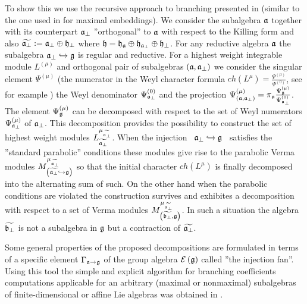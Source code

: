 \documentclass[12pt]{article}
\theoremstyle{definition}
\begin{document}
To show this we use the recursive approach to branching presented in \cite{2010arXiv1007.0318L} (similar to the one used in \cite{ilyin812pbc} for maximal
embeddings). We consider the subalgebra $\frak{a}$ together with its
counterpart $\frak{a}_{\bot }$ ''orthogonal'' to $\frak{a}$ with respect to
the Killing form and also $\widetilde{\frak{a}_{\perp }}:=\frak{a}_{\perp
}\oplus \frak{h}_{\perp }$ where $\frak{h}=\frak{\frak{h}_{\frak{a}}}\oplus 
\frak{h}_{\frak{a}_{\perp }}\oplus \frak{h}_{\perp }$. For any reductive
algebra $\frak{a}$ the subalgebra $\frak{a}_{\bot }\hookrightarrow \frak{g}$
is regular and reductive. For a highest weight integrable module $L^{\left(
\mu \right) }$ and orthogonal pair of subalgebras $\left( \frak{a},\frak{a}%
_{\bot }\right) $ we consider the singular element $\Psi ^{\left( \mu
\right) }$ (the numerator in the Weyl character formula $ch\left( L^{\mu
}\right) =\frac{\Psi ^{\left( \mu \right) }}{\Psi ^{\left( 0\right) }}$, see
for example \cite{humphreys1997introduction}) the Weyl denominator $\Psi _{%
\frak{a}_{\bot }}^{\left( 0\right) }$ and the projection $\Psi _{\left(
\frak{a},\frak{a}_{\bot }\right) }^{\left( \mu \right) }=\pi _{\frak{a}}%
\frac{\Psi _{\frak{g}}^{\left( \mu \right) }}{\Psi _{\frak{a}_{\bot
}}^{\left( 0\right) }}$. The element $\Psi _{\frak{g}}^{\left( \mu \right) }$
can be decomposed with respect to the set of Weyl numerators $\Psi _{\frak{a}%
_{\bot }}^{\left( \mu \right) }$ of $\frak{a}_{\bot }$. This decomposition
provides the possibility to construct the set of highest weight modules $L_{%
\widetilde{\frak{a}_{\perp }}}^{\mu _{\widetilde{\frak{a}_{\perp }}}}$. When
the injection \ $\frak{a}_{\bot }\hookrightarrow \frak{g}$ \ satisfies the
''standard parabolic'' conditions these modules give rise to the parabolic
Verma modules $M_{\left( \widetilde{\frak{a}_{\perp }}\hookrightarrow \frak{g%
}\right) }^{\mu _{\widetilde{\frak{a}_{\perp }}}}$ so that the initial
character $ch\left( L^{\mu }\right) $ is finally decomposed into the
alternating sum of such. On the other hand when the parabolic conditions are
violated the construction survives and exhibites a decomposition with
respect to a set of Verma modules $M_{\left( \widetilde{\frak{b}_{\perp }},%
\frak{g}\right) }^{\mu _{\widetilde{\frak{a}_{\perp }}}}$. In such a
situation the algebra $\widetilde{\frak{b}_{\perp }}$ is not a subalgebra in 
$\frak{g}$ but a contraction of $\widetilde{\frak{a}_{\perp }}$.

Some general properties of the proposed decompositions are formulated in
terms of a specific element $\Gamma _{\frak{a}\rightarrow \frak{g}}$ of the
group algebra $\mathcal{E}\left( \frak{g}\right) $ called ''the injection
fan''. Using this tool the simple and explicit algorithm for branching
coefficients computations applicable for an arbitrary (maximal or
nonmaximal) subalgebras of finite-dimensional or affine Lie algebras was
obtained in \cite{2010arXiv1007.0318L}.
\end{document}
